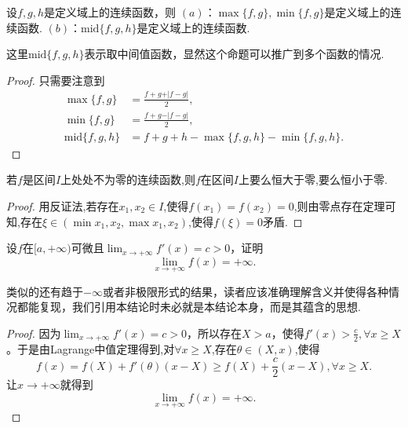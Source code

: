 \documentclass[lang=cn,newtx,10pt,scheme=chinese]{elegantbook}
\begin{document}
\begin{proposition}[多个函数取最值或者中间值]\label{proposition:多个函数取最值或者中间值}
设\(f,g,h\)是定义域上的连续函数，则
\((a)\)：\(\max\{f,g\}, \min\{f,g\}\)是定义域上的连续函数.
\((b)\)：\(\text{mid}\{f,g,h\}\)是定义域上的连续函数.
\end{proposition}
\begin{remark}
   这里\(\text{mid}\{f,g,h\}\)表示取中间值函数，显然这个命题可以推广到多个函数的情况.
\end{remark}
\begin{proof}
   只需要注意到
\begin{align*}
\max\{f,g\}&=\frac{f + g+\vert f - g\vert}{2},\\
\min\{f,g\}&=\frac{f + g-\vert f - g\vert}{2},\\
\text{mid}\{f,g,h\}&=f + g + h-\max\{f,g,h\}-\min\{f,g,h\}.
\end{align*}
\end{proof}

\begin{proposition}\label{proposition:连续函数无零点则一定恒大于零或恒小于零}
   若\(f\)是区间\(I\)上处处不为零的连续函数,则\(f\)在区间\(I\)上要么恒大于零,要么恒小于零.
\end{proposition}
\begin{proof}
   用反证法,若存在$x_1,x_2\in I$,使得$f(x_1)=f(x_2)=0$,则由零点存在定理可知,存在$\xi \in (\min{x_1,x_2},\max{x_1,x_2})$,使得$f(\xi)=0$矛盾.
\end{proof}

\begin{proposition}[导数有正增长率则函数爆炸]\label{proposition:导数有正增长率则函数爆炸}
   设\(f\)在\([a,+\infty)\)可微且\(\lim_{x\rightarrow +\infty}f'(x)=c > 0\)，证明
\[\lim_{x\rightarrow +\infty}f(x)=+\infty.\]
\end{proposition}
\begin{note}
   类似的还有趋于\(-\infty\)或者非极限形式的结果，读者应该准确理解含义并使得各种情况都能复现，我们引用本结论时未必就是本结论本身，而是其蕴含的思想.
\end{note}
\begin{proof}
   因为\(\lim_{x\rightarrow +\infty}f'(x)=c > 0\)，所以存在\(X > a\)，使得\(f'(x)>\frac{c}{2},\forall x\geqslant X\)。于是由Lagrange中值定理得到,对$\forall x\geqslant X$,存在$\theta \in (X,x)$,使得
\[f(x)=f(X)+f'(\theta)(x - X)\geqslant f(X)+\frac{c}{2}(x - X),\forall x\geqslant X.\]
让\(x\rightarrow +\infty\)就得到
\[\lim_{x\rightarrow +\infty}f(x)=+\infty.\]
\end{proof}
\end{document}
